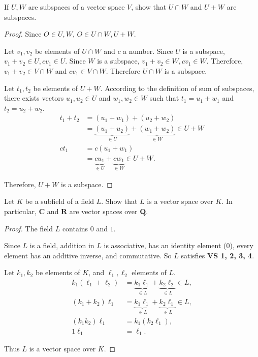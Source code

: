 \begin{exercise}
    If $U, W$ are subspaces of a vector space $V$, show that $U\cap W$ and $U + W$ are subspaces.
\end{exercise}

\begin{proof}
    Since $O\in U, W$, $O\in U\cap W, U + W$.

    Let $v_{1}, v_{2}$ be elements of $U\cap W$ and $c$ a number. Since $U$ is a subspace, $v_{1} + v_{2}\in U, cv_{1}\in U$. Since $W$ is a subspace, $v_{1} + v_{2}\in W, cv_{1}\in W$. Therefore, $v_{1} + v_{2}\in V\cap W$ and $cv_{1}\in V\cap W$. Therefore $U\cap W$ is a subspace.

    Let $t_{1}, t_{2}$ be elements of $U + W$. According to the definition of sum of subspaces, there exists vectors $u_{1}, u_{2}\in U$ and $w_{1}, w_{2}\in W$ such that $t_{1} = u_{1} + w_{1}$ and $t_{2} = u_{2} + w_{2}$.
    \begin{align*}
        t_{1} + t_{2} & = (u_{1} + w_{1}) + (u_{2} + w_{2})                                                     \\
                      & = \underbrace{(u_{1} + u_{2})}_{\in U} + \underbrace{(w_{1} + w_{2})}_{\in W} \in U + W \\
        ct_{1}        & = c(u_{1} + w_{1})                                                                      \\
                      & = \underbrace{cu_{1}}_{\in U} + \underbrace{cw_{1}}_{\in W} \in U + W.
    \end{align*}

    Therefore, $U + W$ is a subspace.
\end{proof}

\begin{exercise}
    Let $K$ be a subfield of a field $L$. Show that $L$ is a vector space over $K$. In particular, $\mathbf{C}$ and $\mathbf{R}$ are vector spaces over $\mathbf{Q}$.
\end{exercise}

\begin{proof}
    The field $L$ contains $0$ and $1$.

    Since $L$ is a field, addition in $L$ is associative, has an identity element ($0$), every element has an additive inverse, and commutative. So $L$ satisfies \textbf{VS 1, 2, 3, 4}.

    Let $k_{1}, k_{2}$ be elements of $K$, and $\ell_{1}, \ell_{2}$ elements of $L$.
    \begin{align*}
        k_{1}(\ell_{1} + \ell_{2}) & = \underbrace{k_{1}\ell_{1}}_{\in L} + \underbrace{k_{2}\ell_{2}}_{\in L} \in L, \\
        (k_{1} + k_{2})\ell_{1}    & = \underbrace{k_{1}\ell_{1}}_{\in L} + \underbrace{k_{2}\ell_{1}}_{\in L} \in L, \\
        (k_{1}k_{2})\ell_{1}       & = k_{1}(k_{2}\ell_{1}),                                                          \\
        1\ell_{1}                  & = \ell_{1}.
    \end{align*}

    Thus $L$ is a vector space over $K$.
\end{proof}

